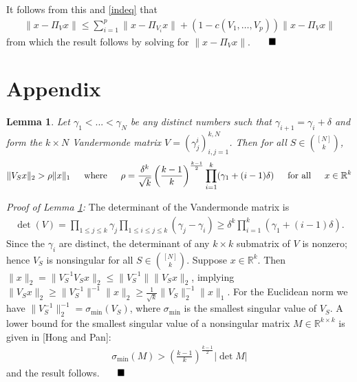 \documentclass[journal,onecolumn]{IEEEtran}
\newtheorem{lemma}{Lemma}
\begin{document}
It follows from this and \eqref{indeq} that
\begin{align*}
\|x - \Pi_Vx\| \leq \sum_{i=1}^p \|x - \Pi_{V_i} x\|+ (1-c(V_1, \ldots, V_p)) \|x - \Pi_Vx\|
\end{align*}
%
from which the result follows by solving for $\|x - \Pi_Vx\|$. $\indent \blacksquare$

\section{Appendix} 


\begin{lemma}\label{MatrixLowerBoundLemma}
Let $\gamma_1 < ... < \gamma_N$ be any distinct numbers such that $\gamma_{i+1} = \gamma_i + \delta$ and form the $k \times N$ Vandermonde matrix $V = (\gamma^i_j)^{k,N}_{i,j=1}$. Then for all $S \in {[N] \choose k}$, 
\begin{align}
	\|V_S x\|_2 > \rho \|x\|_1 \indent \text{where} \indent \rho = \frac{\delta^k}{\sqrt{k}} \left( \frac{k-1}{k} \right)^\frac{k-1}{2} \prod_{i = 1}^k (\gamma_1 + (i-1)\delta) \indent \text{for all} \indent x \in \mathbb{R}^k
\end{align}
\end{lemma}

\emph{Proof of Lemma \ref{MatrixLowerBoundLemma}:} The determinant of the Vandermonde matrix is
\begin{align}
	\det(V) = \prod_{1 \leq j \leq k} \gamma_j \prod_{1 \leq i \leq j \leq k} (\gamma_j - \gamma_i) \geq \delta^k \prod_{i = 1}^k (\gamma_1 + (i-1)\delta).
\end{align}	
Since the $\gamma_i$ are distinct, the determinant of any $k \times k$ submatrix of $V$ is nonzero; hence $V_S$ is nonsingular for all $S \in {[N] \choose k}$. Suppose $x \in \mathbb{R}^k$. Then $\|x\|_2 = \|V_S^{-1} V_S x\|_2 \leq \|V_S^{-1}\| \|V_S x\|_2$, implying $\|V_Sx\|_2 \geq \|V_S^{-1}\|^{-1}\|x\|_2 \geq \frac{1}{\sqrt{k}} \|V_S\|_2^{-1}\|x\|_1$. For the Euclidean norm we have $\|V_S^{-1}\|_2^{-1} = \sigma_{\min}(V_S)$, where $\sigma_{\min}$ is the smallest singular value of $V_S$. A lower bound for the smallest singular value of a nonsingular matrix $M \in \mathbb{R}^{k \times k}$ is given in [Hong and Pan]:
\begin{align}
	\sigma_{\min}(M) > \left( \frac{k-1}{k} \right)^\frac{k-1}{2} |\det M|
\end{align}
%
and the result follows. $\indent \blacksquare$
\end{document}
